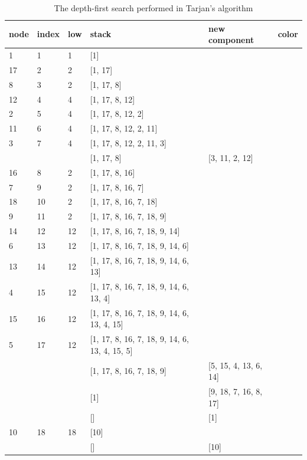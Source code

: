 \documentclass{l4proj}
\begin{document}
\begin{table}[H]
\centering
\begin{tabular}{|l|l|l|l|l|l|}
\hline
node & index & low & stack & new component & color \\
\hline
1& 1 & 1 & [1] & & \cellcolor{babyblue} \\
\hline
17& 2 & 2 & [1, 17] & & \cellcolor{yellow} \\
\hline
8& 3 & 2 & [1, 17, 8] & & \cellcolor{yellow} \\
\hline
12& 4 & 4 & [1, 17, 8, 12] & & \cellcolor{amber} \\
\hline
2& 5 & 4 & [1, 17, 8, 12, 2] & & \cellcolor{amber} \\
\hline
11& 6 & 4 & [1, 17, 8, 12, 2, 11] & & \cellcolor{amber} \\
\hline
3& 7 & 4 & [1, 17, 8, 12, 2, 11, 3] & & \cellcolor{amber} \\
\hline
& & & [1, 17, 8] & [3, 11, 2, 12] & \\
\hline
16& 8 & 2 & [1, 17, 8, 16] & & \cellcolor{yellow} \\
\hline
7& 9 & 2 & [1, 17, 8, 16, 7] & & \cellcolor{yellow} \\
\hline
18& 10 & 2 & [1, 17, 8, 16, 7, 18] & & \cellcolor{yellow} \\
\hline
9& 11 & 2 & [1, 17, 8, 16, 7, 18, 9] & & \cellcolor{yellow} \\
\hline
14& 12 & 12 & [1, 17, 8, 16, 7, 18, 9, 14] & & \cellcolor{applegreen} \\
\hline
6& 13 & 12 & [1, 17, 8, 16, 7, 18, 9, 14, 6] & & \cellcolor{applegreen} \\
\hline
13& 14 & 12 & [1, 17, 8, 16, 7, 18, 9, 14, 6, 13] & & \cellcolor{applegreen} \\
\hline
4& 15 & 12 & [1, 17, 8, 16, 7, 18, 9, 14, 6, 13, 4] & & \cellcolor{applegreen} \\
\hline
15& 16 & 12 & [1, 17, 8, 16, 7, 18, 9, 14, 6, 13, 4, 15] & & \cellcolor{applegreen} \\
\hline
5& 17 & 12 & [1, 17, 8, 16, 7, 18, 9, 14, 6, 13, 4, 15, 5] & & \cellcolor{applegreen} \\
\hline
& & & [1, 17, 8, 16, 7, 18, 9] & [5, 15, 4, 13, 6, 14] & \\
\hline
& & & [1] & [9, 18, 7, 16, 8, 17] & \\
\hline
& & & [] & [1] & \\
\hline
10& 18 & 18 & [10] & & \cellcolor{americanrose} \\
\hline
& & & [] & [10] & \\
\hline
\end{tabular}
\caption{The depth-first search performed in Tarjan's algorithm \cite{tarjan1972depth}}
\label{tarjantable}
\end{table}
\end{document}
